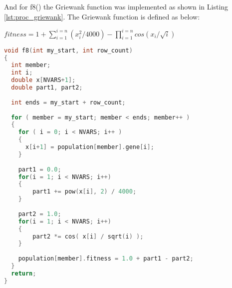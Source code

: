 And for f8() the Griewank function was implemented as shown in Listing \ref{lst:proc_griewank}. The Griewank function is defined as below:

$fitness = 1 +  \sum_{i=1}^{i=n}(x_i^2/4000) - \prod_{i=1}^{i=n}cos(x_i/\sqrt{i}) $

\begin{lstlisting}[language=C, caption={Fitness function - Implementation of Griewank function}, label={lst:proc_griewank}]
void f8(int my_start, int row_count)
{
  int member;
  int i;
  double x[NVARS+1];
  double part1, part2;
  
  int ends = my_start + row_count;
  
  for ( member = my_start; member < ends; member++ )
  {
    for ( i = 0; i < NVARS; i++ )
    {
      x[i+1] = population[member].gene[i];
    }
    
    part1 = 0.0;
    for(i = 1; i < NVARS; i++)
    {
        part1 += pow(x[i], 2) / 4000;
    }
    
    part2 = 1.0;
    for(i = 1; i < NVARS; i++)
    {
        part2 *= cos( x[i] / sqrt(i) );
    }
       
    population[member].fitness = 1.0 + part1 - part2;
  }
  return;
}
\end{lstlisting}

